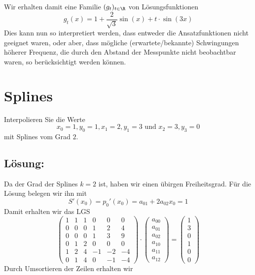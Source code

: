 Wir erhalten damit eine Familie $(g_t)_{t \in \R}$ von Lösungsfunktionen
$$
g_t(x)=1+\frac{2}{\sqrt{3}}\sin(x)+t\cdot \sin(3x)
$$
Dies kann nun so interpretiert werden, dass entweder die Ansatzfunktionen nicht geeignet waren, oder aber, dass mögliche (erwartete/bekannte) Schwingungen höherer Frequenz, die durch den Abstand der Messpunkte nicht beobachtbar waren, so berücksichtigt werden können.
\section{Splines}
Interpolieren Sie die Werte
$$
x_0=1, y_0=1, x_1=2, y_1=3 \text{ und } x_2=3, y_3=0
$$
mit Splines vom Grad $2$.
\vspace{5mm}

\subsection*{Lösung:}
Da der Grad der Splines $k=2$ ist, haben wir einen übirgen Freiheitsgrad. Für die Lösung belegen wir ihn mit
$$
S'(x_0)=p_0'(x_0)=a_{01}+2a_{02}x_0=1
$$
Damit erhalten wir das LGS
$$
\begin{pmatrix}1& 1 & 1 & 0 &0&0  \\ 0&0&0&1&2&4 \\ 0&0&0&1&3&9 \\ 0&1&2 & 0&0&0\\1&2&4 &-1&-2&-4\\ 0&1&4 &0&-1&-4 \end{pmatrix}\cdot \begin{pmatrix} a_{00}\\a_{01}\\ a_{02}\\ a_{10}\\ a_{11}\\ a_{12}   \end{pmatrix}=\begin{pmatrix} 1\\3\\0\\1\\0\\0 \end{pmatrix}
$$
Durch Umsortieren der Zeilen erhalten wir

